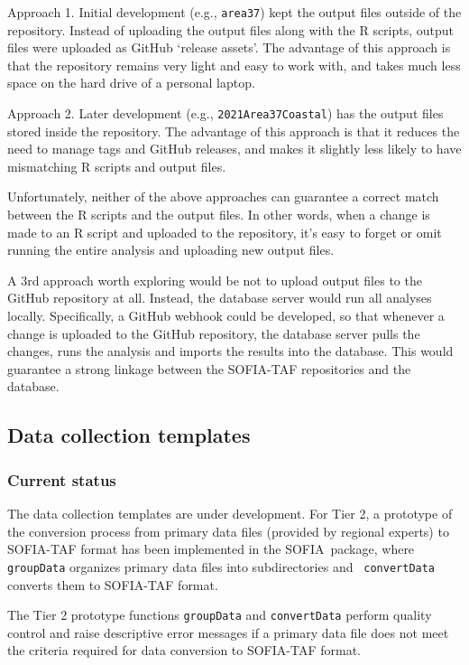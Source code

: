 \documentclass[12pt]{article}
\newcommand\SOFIA{{\sf SOFIA}}
\begin{document}
Approach 1. Initial development (e.g., \verb|area37|) kept the output files
outside of the repository. Instead of uploading the output files along with the
R scripts, output files were uploaded as GitHub `release assets'. The advantage
of this approach is that the repository remains very light and easy to work
with, and takes much less space on the hard drive of a personal laptop.

Approach 2. Later development (e.g., \verb|2021Area37Coastal|) has the output
files stored inside the repository. The advantage of this approach is that it
reduces the need to manage tags and GitHub releases, and makes it slightly less
likely to have mismatching R scripts and output files.

Unfortunately, neither of the above approaches can guarantee a correct match
between the R scripts and the output files. In other words, when a change is
made to an R script and uploaded to the repository, it's easy to forget or omit
running the entire analysis and uploading new output files.

A 3rd approach worth exploring would be not to upload output files to the GitHub
repository at all. Instead, the database server would run all analyses locally.
Specifically, a GitHub webhook could be developed, so that whenever a change is
uploaded to the GitHub repository, the database server pulls the changes, runs
the analysis and imports the results into the database. This would guarantee a
strong linkage between the SOFIA-TAF repositories and the database.\\[-2ex]

\subsection{Data collection templates}

\subsubsection{Current status}

The data collection templates are under development. For Tier 2, a prototype of
the conversion process from primary data files (provided by regional experts) to
SOFIA-TAF format has been implemented in the \SOFIA\ package, where {\tt
  groupData} organizes primary data files into subdirectories and {\tt
  convertData} converts them to SOFIA-TAF format.

The Tier 2 prototype functions {\tt groupData} and {\tt convertData}
perform quality control and raise descriptive error messages if a primary data
file does not meet the criteria required for data conversion to SOFIA-TAF
format.
\end{document}
